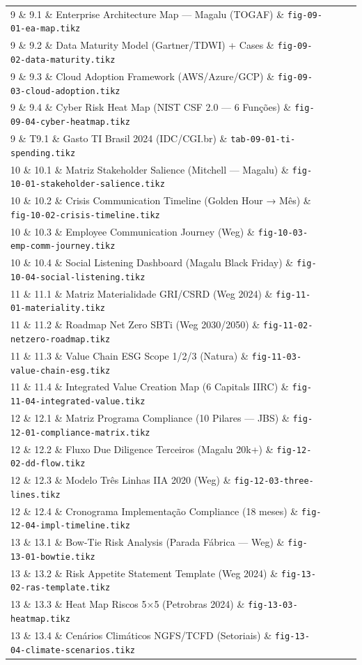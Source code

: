 \begin{longtable}{p{1.5cm}p{4cm}p{5.5cm}p{4cm}}
9 \& 9.1 \& Enterprise Architecture Map — Magalu (TOGAF) \& \texttt{fig-09-01-ea-map.tikz}\\
9 \& 9.2 \& Data Maturity Model (Gartner/TDWI) + Cases \& \texttt{fig-09-02-data-maturity.tikz}\\
9 \& 9.3 \& Cloud Adoption Framework (AWS/Azure/GCP) \& \texttt{fig-09-03-cloud-adoption.tikz}\\
9 \& 9.4 \& Cyber Risk Heat Map (NIST CSF 2.0 — 6 Funções) \& \texttt{fig-09-04-cyber-heatmap.tikz}\\
9 \& T9.1 \& Gasto TI Brasil 2024 (IDC/CGI.br) \& \texttt{tab-09-01-ti-spending.tikz}\\

10 \& 10.1 \& Matriz Stakeholder Salience (Mitchell — Magalu) \& \texttt{fig-10-01-stakeholder-salience.tikz}\\
10 \& 10.2 \& Crisis Communication Timeline (Golden Hour → Mês) \& \texttt{fig-10-02-crisis-timeline.tikz}\\
10 \& 10.3 \& Employee Communication Journey (Weg) \& \texttt{fig-10-03-emp-comm-journey.tikz}\\
10 \& 10.4 \& Social Listening Dashboard (Magalu Black Friday) \& \texttt{fig-10-04-social-listening.tikz}\\

11 \& 11.1 \& Matriz Materialidade GRI/CSRD (Weg 2024) \& \texttt{fig-11-01-materiality.tikz}\\
11 \& 11.2 \& Roadmap Net Zero SBTi (Weg 2030/2050) \& \texttt{fig-11-02-netzero-roadmap.tikz}\\
11 \& 11.3 \& Value Chain ESG Scope 1/2/3 (Natura) \& \texttt{fig-11-03-value-chain-esg.tikz}\\
11 \& 11.4 \& Integrated Value Creation Map (6 Capitals IIRC) \& \texttt{fig-11-04-integrated-value.tikz}\\

12 \& 12.1 \& Matriz Programa Compliance (10 Pilares — JBS) \& \texttt{fig-12-01-compliance-matrix.tikz}\\
12 \& 12.2 \& Fluxo Due Diligence Terceiros (Magalu 20k+) \& \texttt{fig-12-02-dd-flow.tikz}\\
12 \& 12.3 \& Modelo Três Linhas IIA 2020 (Weg) \& \texttt{fig-12-03-three-lines.tikz}\\
12 \& 12.4 \& Cronograma Implementação Compliance (18 meses) \& \texttt{fig-12-04-impl-timeline.tikz}\\

13 \& 13.1 \& Bow-Tie Risk Analysis (Parada Fábrica — Weg) \& \texttt{fig-13-01-bowtie.tikz}\\
13 \& 13.2 \& Risk Appetite Statement Template (Weg 2024) \& \texttt{fig-13-02-ras-template.tikz}\\
13 \& 13.3 \& Heat Map Riscos 5×5 (Petrobras 2024) \& \texttt{fig-13-03-heatmap.tikz}\\
13 \& 13.4 \& Cenários Climáticos NGFS/TCFD (Setoriais) \& \texttt{fig-13-04-climate-scenarios.tikz}\\


\end{longtable}
